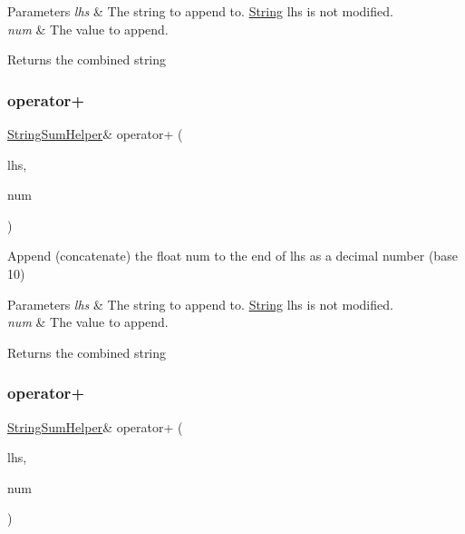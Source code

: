 \begin{DoxyParams}{Parameters}
{\em lhs} & The string to append to. \hyperlink{class_string}{String} lhs is not modified.\\
\hline
{\em num} & The value to append.\\
\hline
\end{DoxyParams}
\begin{DoxyReturn}{Returns}
the combined string 
\end{DoxyReturn}
\mbox{\label{class_string_a9a2cbb5207527b7dabf2ea13c48f9833}} 
\subsubsection{\texorpdfstring{operator+}{operator+}\hspace{0.1cm}{\footnotesize\ttfamily [9/10]}}
{\footnotesize\ttfamily \hyperlink{class_string_sum_helper}{String\+Sum\+Helper}\& operator+ (\begin{DoxyParamCaption}\item[{const \hyperlink{class_string_sum_helper}{String\+Sum\+Helper} \&}]{lhs,  }\item[{float}]{num }\end{DoxyParamCaption})\hspace{0.3cm}{\ttfamily [friend]}}



Append (concatenate) the float num to the end of lhs as a decimal number (base 10) 


\begin{DoxyParams}{Parameters}
{\em lhs} & The string to append to. \hyperlink{class_string}{String} lhs is not modified.\\
\hline
{\em num} & The value to append.\\
\hline
\end{DoxyParams}
\begin{DoxyReturn}{Returns}
the combined string 
\end{DoxyReturn}
\mbox{\label{class_string_ad7f8cc6402796f520aa6ddc33953f7fc}} 
\subsubsection{\texorpdfstring{operator+}{operator+}\hspace{0.1cm}{\footnotesize\ttfamily [10/10]}}
{\footnotesize\ttfamily \hyperlink{class_string_sum_helper}{String\+Sum\+Helper}\& operator+ (\begin{DoxyParamCaption}\item[{const \hyperlink{class_string_sum_helper}{String\+Sum\+Helper} \&}]{lhs,  }\item[{double}]{num }\end{DoxyParamCaption})\hspace{0.3cm}{\ttfamily [friend]}}



